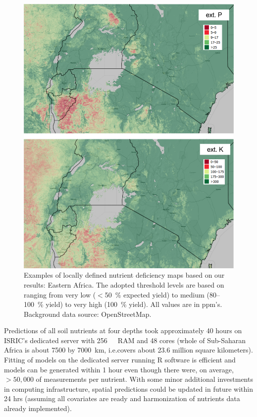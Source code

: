 \begin{linenumbers}
\begin{figure}[!hp]
\includegraphics[width=.85\textwidth]{Fig_AfNutrients_defficiency_EAfrica.png} %
\caption{Examples of locally defined nutrient deficiency maps based on our results: Eastern Africa. The adopted threshold levels are based on \citet[p.78]{roy2006plant} ranging from very low ($<$\SI{50}{\percent} expected yield) to medium (80--\SI{100}{\percent} yield) to very high (\SI{100}{\percent} yield). All values are in ppm's. Background data source: OpenStreetMap.}
\label{fig:defficiency2}
\end{figure}

\clearpage

Predictions of all soil nutrients at four depths took approximately 40 hours on ISRIC's dedicated server with \SI{256}{\gibi\byte}~RAM and 48 cores (whole of Sub-Saharan Africa is about 7500 by \SI{7000}{\kilo\metre}, i.e.\@ covers about 23.6 million square kilometers). Fitting of models on the dedicated server running \textsf{R} software is efficient and models can be generated within 1 hour even though there were, on average, $>50,000$ of measurements per nutrient. With some minor additional investments in computing infrastructure, spatial predictions could be updated in future within 24 hrs (assuming all covariates are ready and harmonization of nutrients data already implemented).\par


\end{linenumbers}
